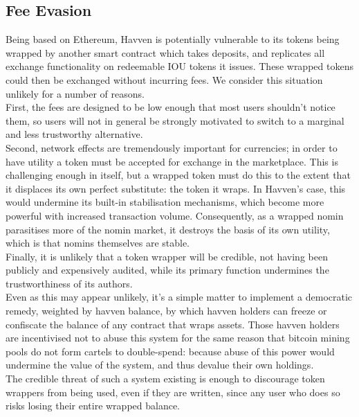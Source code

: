 \newpage

\subsection{Fee Evasion}

\noindent Being based on Ethereum, Havven is potentially vulnerable to its
tokens being wrapped by another smart contract which takes deposits, and
replicates all exchange functionality on redeemable IOU tokens it issues.
These wrapped tokens could then be exchanged without incurring fees.
\noindent We consider this situation unlikely for a number of reasons. \\

\noindent First, the fees are designed to be low enough that most users
shouldn't notice them, so users will not in general be strongly motivated to
switch to a marginal and less trustworthy alternative. \\

\noindent Second, network effects are tremendously important for currencies;
in order to have utility a token must be accepted for exchange in the
marketplace. This is challenging enough in itself, but a wrapped token must
do this to the extent that it displaces its own perfect substitute: the token
it wraps. \noindent In Havven's case, this would undermine its built-in
stabilisation mechanisms, which become more powerful with increased
transaction volume. Consequently, as a wrapped nomin parasitises more of the
nomin market, it destroys the basis of its own utility, which is that nomins
themselves are stable. \\

\noindent Finally, it is unlikely that a token wrapper will be credible, not
having been publicly and expensively audited, while its primary function
undermines the trustworthiness of its authors. \\

\noindent Even as this may appear unlikely, it's a simple matter to implement
a democratic remedy, weighted by havven balance, by which havven holders can
freeze or confiscate the balance of any contract that wraps assets. Those
havven holders are incentivised not to abuse this system for the same reason
that bitcoin mining pools do not form cartels to double-spend: because abuse
of this power would undermine the value of the system, and thus devalue their
own holdings. \\

\noindent The credible threat of such a system existing is enough to
discourage token wrappers from being used, even if they are written, since
any user who does so risks losing their entire wrapped balance.